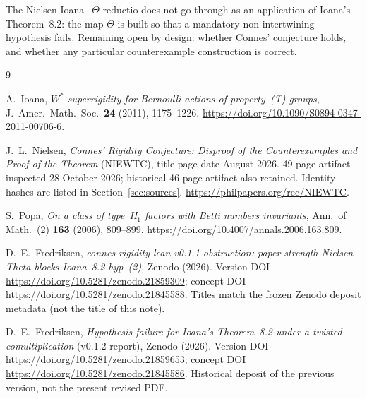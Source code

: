 \documentclass[11pt]{article}
\begin{document}
The Nielsen Ioana$+\Theta$ reductio does not go through as an application of
Ioana's Theorem~8.2: the map $\Theta$ is built so that a mandatory
non-intertwining hypothesis fails. Remaining open by design: whether Connes'
conjecture holds, and whether any particular counterexample construction is
correct.

\begin{thebibliography}{9}

A.~Ioana,
\emph{$W^*$-superrigidity for Bernoulli actions of property~(T) groups},
J.~Amer.\ Math.\ Soc.\ \textbf{24} (2011), 1175--1226.
\url{https://doi.org/10.1090/S0894-0347-2011-00706-6}.

J.~L.~Nielsen,
\emph{Connes' Rigidity Conjecture: Disproof of the Counterexamples
and Proof of the Theorem} (NIEWTC), title-page date August 2026.
49-page artifact inspected 28 October 2026; historical 46-page artifact
also retained. Identity hashes are listed in Section~\ref{sec:sources}.
\url{https://philpapers.org/rec/NIEWTC}.

S.~Popa,
\emph{On a class of type~II$_1$ factors with Betti numbers invariants},
Ann.\ of Math.\ (2) \textbf{163} (2006), 809--899.
\url{https://doi.org/10.4007/annals.2006.163.809}.

D.~E.~Fredriksen,
\emph{connes-rigidity-lean v0.1.1-obstruction: paper-strength Nielsen
Theta blocks Ioana~8.2 hyp~(2)},
Zenodo (2026).
Version DOI \url{https://doi.org/10.5281/zenodo.21859309};
concept DOI \url{https://doi.org/10.5281/zenodo.21845588}.
Titles match the frozen Zenodo deposit metadata (not the title of this note).

D.~E.~Fredriksen,
\emph{Hypothesis failure for Ioana's Theorem~8.2 under a twisted
comultiplication} (v0.1.2-report),
Zenodo (2026).
Version DOI \url{https://doi.org/10.5281/zenodo.21859653};
concept DOI \url{https://doi.org/10.5281/zenodo.21845586}.
Historical deposit of the previous version, not the present revised PDF.

\end{thebibliography}
\end{document}
